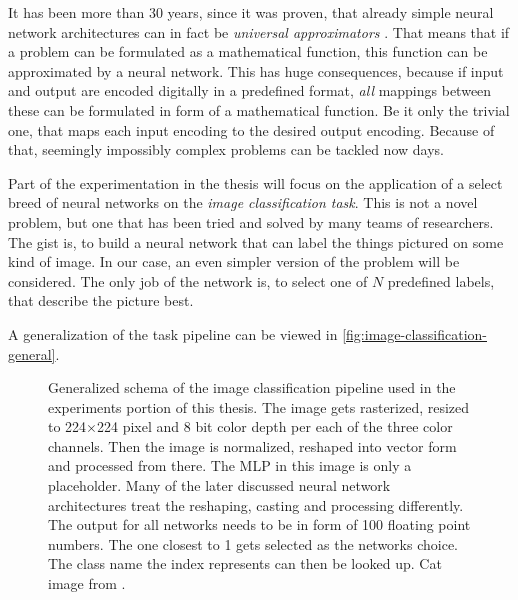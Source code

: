 It has been more than 30 years, since it was proven, that already simple neural network architectures can in fact be \emph{universal approximators} \cite*{ffnUnversalApproximator}. 
That means that if a problem can be formulated as a mathematical function, this function can be approximated by a neural network.
This has huge consequences, because if input and output are encoded digitally in a predefined format, \emph{all} mappings between these can be formulated in form of a mathematical function. 
Be it only the trivial one, that maps each input encoding to the desired output encoding.
Because of that, seemingly impossibly complex problems can be tackled now days. 

Part of the experimentation in the thesis will focus on the application of a select breed of neural networks on the \emph{image classification task}.
This is not a novel problem, but one that has been tried and solved by many teams of researchers. 
The gist is, to build a neural network that can label the things pictured on some kind of image.
In our case, an even simpler version of the problem will be considered. 
The only job of the network is, to select one of $N$ predefined labels, that describe the picture best.

A generalization of the task pipeline can be viewed in \autoref{fig:image-classification-general}.

\begin{figure}[htbp]
    \centering
    \caption{Generalized schema of the image classification pipeline used in the experiments portion of this thesis.
        The image gets rasterized, resized to 224$\times$224 pixel and 8 bit color depth per each of the three color channels. Then the image is normalized, reshaped into vector form and processed from there. The MLP in this image is only a placeholder. Many of the later discussed neural network architectures treat the reshaping, casting and processing differently. The output for all networks needs to be in form of 100 floating point numbers. The one closest to 1 gets selected as the networks choice. The class name the index represents can then be looked up.
        Cat image from \cite{catPhoto}.
    }
    \label{fig:image-classification-general}
\end{figure}

